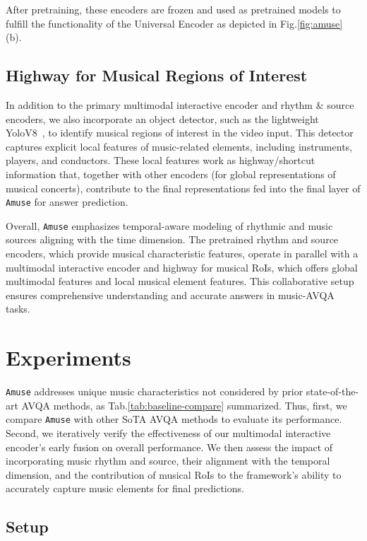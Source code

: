 \documentclass[11pt]{article}
\begin{document}
After pretraining, these encoders are frozen and used as pretrained models to fulfill the functionality of the Universal Encoder as depicted in Fig.\ref{fig:amuse} (b).

\subsection{Highway for Musical Regions of Interest}
In addition to the primary multimodal interactive encoder and rhythm \& source encoders, we also incorporate an object detector, such as the lightweight YoloV8~\cite{Ultralytics2023yolov8}, to identify musical regions of interest in the video input. This detector captures explicit local features of music-related elements, including instruments, players, and conductors. These local features work as highway/shortcut information that, together with other encoders (for global representations of musical concerts), contribute to the final representations fed into the final layer of \texttt{Amuse} for answer prediction.

Overall, \texttt{Amuse} emphasizes temporal-aware modeling of rhythmic and music sources aligning with the time dimension. The pretrained rhythm and source encoders, which provide musical characteristic features, operate in parallel with a multimodal interactive encoder and highway for musical RoIs, which offers global multimodal features and local musical element features. This collaborative setup ensures comprehensive understanding and accurate answers in music-AVQA tasks.


\section{Experiments}
\texttt{Amuse} addresses unique music characteristics not considered by prior state-of-the-art AVQA methods, as Tab.\ref{tab:baseline-compare} summarized. Thus, first, we compare \texttt{Amuse} with other SoTA AVQA methods to evaluate its performance. Second, we iteratively verify the effectiveness of our multimodal interactive encoder's early fusion on overall performance. We then assess the impact of incorporating music rhythm and source, their alignment with the temporal dimension, and the contribution of musical RoIs to the framework's ability to accurately capture music elements for final predictions.

\subsection{Setup}
\end{document}
